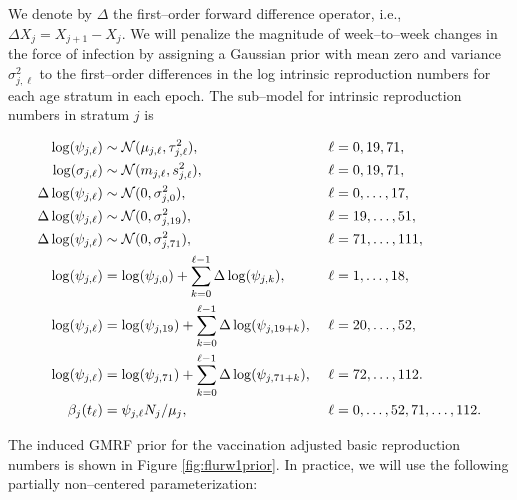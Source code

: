 We denote by $ \Delta $ the first--order forward difference operator, i.e., $ \Delta X_j = X_{j+1} - X_j $. We will penalize the magnitude of week--to--week changes in the force of infection by assigning a Gaussian prior with mean zero and variance $ \sigma^2_{j,\ell} $ to the first--order differences in the log intrinsic reproduction numbers for each age stratum in each epoch. The sub--model for intrinsic reproduction numbers in stratum $ j $ is
\begin{footnotesize}
	\begin{align}
	\log(\psi_{j,\ell}) &\sim \mcN(\mu_{j,\ell},\tau_{j,\ell}^2),&\ &\ell= 0,19,71, \nonumber\\
	\log(\sigma_{j,\ell}) &\sim \mcN(m_{j,\ell}, s_{j,\ell}^2),&\ &\ell=0,19,71, \nonumber\\
	\Delta\log(\psi_{j,\ell})&\sim \mcN(0, \sigma^2_{j,0}),&\ &\ell=0,\dots,17, \nonumber\\
	\Delta\log(\psi_{j,\ell})&\sim \mcN(0, \sigma^2_{j,19}),&\ &\ell=19,\dots,51, \nonumber\\
	\Delta\log(\psi_{j,\ell})&\sim \mcN(0, \sigma^2_{j,71}),&\ &\ell=71,\dots,111, \nonumber\\
	\log(\psi_{j,\ell}) &= \log(\psi_{j,0}) + \sum_{k=0}^{\ell-1}\Delta\log(\psi_{j,k}),&\ &\ell = 1,\dots,18, \nonumber\\
	\log(\psi_{j,\ell}) &= \log(\psi_{j,19}) + \sum_{k=0}^{\ell-1}\Delta\log(\psi_{j,19+k}),&\ &\ell = 20,\dots,52, \nonumber\\
	\log(\psi_{j,\ell}) &= \log(\psi_{j,71}) + \sum_{k=0}^{\ell-1}\Delta\log(\psi_{j,71+k}),&\ &\ell = 72,\dots,112. \nonumber \\
	\beta_j(t_\ell) &= \psi_{j,\ell}N_j/\mu_{j},&\ &\ell=0,\dots,52,71,\dots,112. \nonumber
	\end{align}
\end{footnotesize}

The induced GMRF prior for the vaccination adjusted basic reproduction numbers is shown in Figure \ref{fig:flurw1prior}. In practice, we will use the following partially non--centered parameterization:

